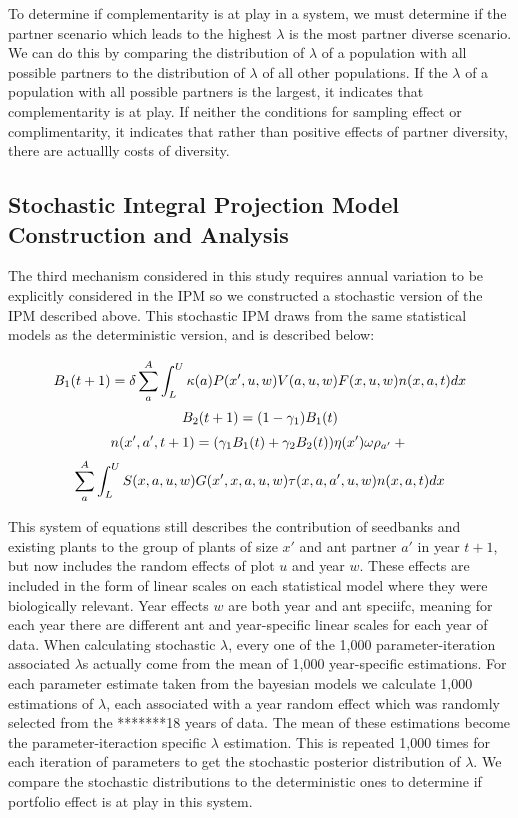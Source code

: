 \documentclass[11pt]{article}
\begin{document}
To determine if complementarity is at play in a system, we must determine if the partner scenario which leads to the highest $\lambda$ is the most partner diverse scenario.
We can do this by comparing the distribution of $\lambda$ of a population with all possible partners to the distribution of $\lambda$ of all other populations.
If the $\lambda$ of a population with all possible partners is the largest, it indicates that complementarity is at play.
If neither the conditions for sampling effect or complimentarity, it indicates that rather than positive effects of partner diversity, there are actuallly costs of diversity.

\subsection*{Stochastic Integral Projection Model Construction and Analysis}
  
The third mechanism considered in this study requires annual variation to be explicitly considered in the IPM so we constructed a stochastic version of the IPM described above. 
This stochastic IPM draws from the same statistical models as the deterministic version, and is described below:

 \begin{linenomath*}
	$$
	B_1(t+1) = \delta \sum_{a}^{A} \int_L^U  \kappa(a) P(x',u,w) V(a,u,w) F(x,u,w) n(x,a,t) dx \\
	$$
	$$
	B_2(t+1) =  (1 - \gamma_1)B_1(t)\\
	$$
	$$
	n(x',a',t+1) = (\gamma_1 B_1(t) + \gamma_2 B_2(t)) \eta(x') \omega \rho_{a'}  + \\
	$$
	$$
	\sum_{a}^{A} \int_L^U S(x,a,u,w) G(x',x,a,u,w) \tau(x,a,a',u,w) n(x,a,t) dx \\
	$$
\end{linenomath*}

This system of equations still describes the contribution of seedbanks and existing plants to the group of plants of size $x'$ and ant partner $a'$ in year $t+1$, but now includes the random effects of plot $u$ and year $w$. 
These effects are included in the form of linear scales on each statistical model where they were biologically relevant.
Year effects $w$ are both year and ant speciifc, meaning for each year there are different ant and year-specific linear scales for each year of data. 
When calculating stochastic $\lambda$, every one of the 1,000 parameter-iteration associated $\lambda$s actually come from the mean of 1,000 year-specific estimations. 
For each parameter estimate taken from the bayesian models we calculate 1,000 estimations of $\lambda$, each associated with a year random effect which was randomly selected from the *******18 years of data.
The mean of these estimations become the parameter-iteraction specific $\lambda$ estimation. 
This is repeated 1,000 times for each iteration of parameters to get the stochastic posterior distribution of $\lambda$.
We compare the stochastic distributions to the deterministic ones to determine if portfolio effect is at play in this system. 
\end{document}
